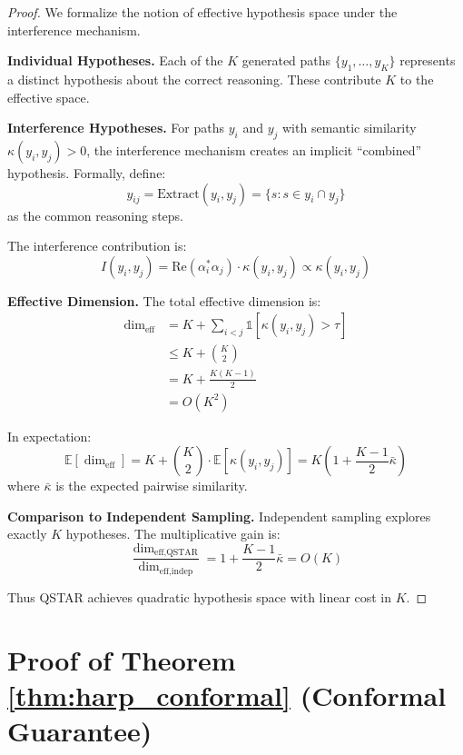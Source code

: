 \documentclass[11pt,a4paper]{article}
\newcommand{\E}{\mathbb{E}}
\begin{document}
\begin{proof}
We formalize the notion of effective hypothesis space under the interference mechanism.

\textbf{Individual Hypotheses.} Each of the $K$ generated paths $\{y_1, \ldots, y_K\}$ represents a distinct hypothesis about the correct reasoning. These contribute $K$ to the effective space.

\textbf{Interference Hypotheses.} For paths $y_i$ and $y_j$ with semantic similarity $\kappa(y_i, y_j) > 0$, the interference mechanism creates an implicit ``combined'' hypothesis. Formally, define:
\begin{equation}
    y_{ij} = \text{Extract}(y_i, y_j) = \{s : s \in y_i \cap y_j\}
\end{equation}
as the common reasoning steps.

The interference contribution is:
\begin{equation}
    I(y_i, y_j) = \text{Re}(\alpha_i^* \alpha_j) \cdot \kappa(y_i, y_j) \propto \kappa(y_i, y_j)
\end{equation}

\textbf{Effective Dimension.} The total effective dimension is:
\begin{align}
    \dim_{\text{eff}} &= K + \sum_{i<j} \mathbb{1}[\kappa(y_i, y_j) > \tau] \\
    &\leq K + \binom{K}{2} \\
    &= K + \frac{K(K-1)}{2} \\
    &= O(K^2)
\end{align}

In expectation:
\begin{equation}
    \E[\dim_{\text{eff}}] = K + \binom{K}{2} \cdot \E[\kappa(y_i, y_j)] = K(1 + \frac{K-1}{2}\bar{\kappa})
\end{equation}
where $\bar{\kappa}$ is the expected pairwise similarity.

\textbf{Comparison to Independent Sampling.} Independent sampling explores exactly $K$ hypotheses. The multiplicative gain is:
\begin{equation}
    \frac{\dim_{\text{eff},\text{QSTAR}}}{\dim_{\text{eff},\text{indep}}} = 1 + \frac{K-1}{2}\bar{\kappa} = O(K)
\end{equation}

Thus QSTAR achieves quadratic hypothesis space with linear cost in $K$.
\end{proof}

\section{Proof of Theorem \ref{thm:harp_conformal} (Conformal Guarantee)}
\end{document}
